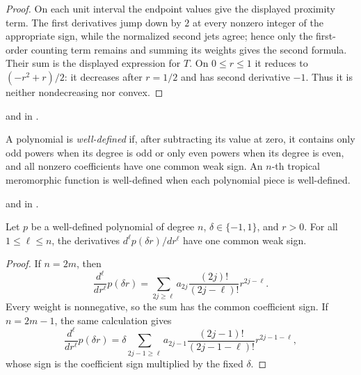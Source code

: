 \begin{proof}
\leanok
On each unit interval the endpoint values give the displayed proximity term.
The first derivatives jump down by $2$ at every nonzero integer of the
appropriate sign, while the normalized second jets agree; hence only the
first-order counting term remains and summing its weights gives the second
formula.  Their sum is the displayed expression for $T$.  On $0\leq r\leq1$
it reduces to $(-r^2+r)/2$: it decreases after $r=1/2$ and has second
derivative $-1$.  Thus it is neither nondecreasing nor convex.
\end{proof}

\begin{leanproof}
 and
 in .
\end{leanproof}

\begin{definition}
\leanok
{}
A polynomial is \emph{well-defined} if, after subtracting its value at zero,
it contains only odd powers when its degree is odd or only even powers when
its degree is even, and all nonzero coefficients have one common weak sign.
An $n$-th tropical meromorphic function is well-defined when each polynomial
piece is well-defined.
\end{definition}

\begin{leanproof}
 and
 in
.
\end{leanproof}

\begin{lemma}
\leanok
{}
Let $p$ be a well-defined polynomial of degree $n$, $\delta\in\{-1,1\}$,
and $r>0$.  For all $1\leq\ell\leq n$, the derivatives
$d^\ell p(\delta r)/dr^\ell$ have one common weak sign.
\end{lemma}

\begin{proof}
\leanok
If $n=2m$, then
\[
 \frac{d^\ell}{dr^\ell}p(\delta r)=
 \sum_{2j\geq\ell}a_{2j}\frac{(2j)!}{(2j-\ell)!}r^{2j-\ell}.
\]
Every weight is nonnegative, so the sum has the common coefficient sign.  If
$n=2m-1$, the same calculation gives
\[
 \frac{d^\ell}{dr^\ell}p(\delta r)=
 \delta\sum_{2j-1\geq\ell}a_{2j-1}
 \frac{(2j-1)!}{(2j-1-\ell)!}r^{2j-1-\ell},
\]
whose sign is the coefficient sign multiplied by the fixed $\delta$.
\end{proof}

